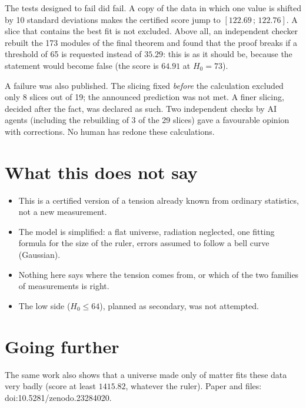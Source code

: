 The tests designed to fail did fail. A copy of the data in which one value is shifted by 10 standard deviations makes
the certified score jump to $[122.69\,;\,122.76]$. A slice that contains the best fit is not excluded. Above all, an
independent checker rebuilt the 173 modules of the final theorem and found that the proof breaks if a threshold of 65
is requested instead of $35.29$: this is as it should be, because the statement would become false (the score is
$64.91$ at $H_0=73$).

A failure was also published. The slicing fixed \emph{before} the calculation excluded only 8 slices out of 19; the
announced prediction was not met. A finer slicing, decided after the fact, was declared as such. Two independent
checks by AI agents (including the rebuilding of 3 of the 29 slices) gave a favourable opinion with corrections. No
human has redone these calculations.

\section*{What this does not say}

\begin{limite}
\begin{itemize}
\item This is a certified version of a tension already known from ordinary statistics, not a new measurement.
\item The model is simplified: a flat universe, radiation neglected, one fitting formula for the size of the ruler,
errors assumed to follow a bell curve (Gaussian).
\item Nothing here says where the tension comes from, or which of the two families of measurements is right.
\item The low side ($H_0\le64$), planned as secondary, was not attempted.
\end{itemize}
\end{limite}

\section*{Going further}

The same work also shows that a universe made only of matter fits these data very badly (score at least
$1415.82$, whatever the ruler). Paper and files: doi:10.5281/zenodo.23284020.

